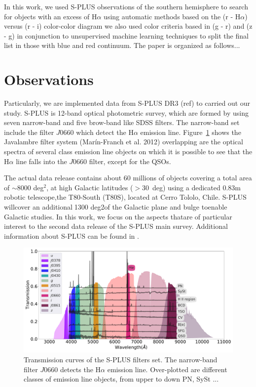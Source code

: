 \documentclass[fleqn,usenatbib]{mnras}
\begin{document}
In this work, we used S-PLUS observations of the southern hemisphere to search
for objects with an excess of H{$\alpha$} using automatic methods based on the
(r - H$\alpha$) versus (r - i) color-color diagram we also used color criteria
based in (g - r) and (z - g) in conjunction to unsupervised machine learning
techniques to split the final list in those with blue and red continuum. The
paper is organized as follows...

\section{Observations}
\label{sec:obser}

Particularly, we are implemented data from S-PLUS DR3 (ref) to carried out our
study. S-PLUS is 12-band optical photometric survey, which are formed by using
seven narrow-band and five brow-band like SDSS filters. The narrow-band set
include the filter $J$0660 which detect the H{$\alpha$} emission line.
Figure~\ref{fig:curves} shows the Javalambre filter system (Marín-Franch et al. 2012)
overlapping are the optical spectra of several class emission line objects on which
it is possible to see that the H{$\alpha$} line falls into the $J$0660 filter, except
for the QSOs.   

The actual data release contains about 60 millions of objects covering a total
area of $\sim$8000 deg$^2$, at high Galactic latitudes ($ > 30$~deg) using a
dedicated 0.83m robotic telescope,the T80-South (T80S), located at Cerro Tololo,
Chile. S-PLUS willcover an additional1300 deg2of the Galactic plane and bulge
toenable Galactic studies. In this work, we focus on the aspects thatare of
particular interest to the second data release of the S-PLUS main survey.
Additional information about S-PLUS can be found in \citet{Mendes:2019}. 

\begin{figure}
    \includegraphics[width=0.9\linewidth]{Figs/splus-filter.pdf}
    \caption{Transmission curves of the S-PLUS filters set. The narrow-band filter
      $J0660$ detects the H$\alpha$ emission line. Over-plotted are different
      classes of emission line objects, from upper to down PN, SySt ... }
    \label{fig:curves}
\end{figure}
\end{document}
